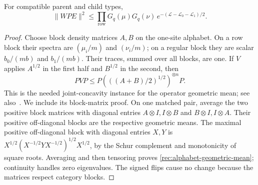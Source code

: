 \begin{lemma}\label{rec:alphabet-angle}
For compatible parent and child types,
\[
 \|WPE\|^2\le
 \prod_{\mathrm{row}}G_q(\mu)G_q(\nu)\,
       e^{-(\mathcal L-\mathcal L_0-\mathcal L_1)/2}.
\]
\end{lemma}
\begin{proof}
Choose block density matrices $A,B$ on the one-site alphabet.  On a
row block their spectra are $(\mu_i/m)$ and $(\nu_i/m)$; on a
regular block they are scalar $b_0/(mb)$ and $b_1/(mb)$.
Their traces, summed over all blocks, are one.  If $V$ applies
$A^{1/2}$ in the first half and $B^{1/2}$ in the second, then
\begin{equation}\label{rec:alphabet-geometric-mean}
 PVP\le P\left(((A+B)/2)^{1/2}\right)^{\otimes n}P.
\end{equation}
This is the needed joint-concavity instance for the operator geometric
mean; see also~\cite[Appendix A.2.1, Lemma~4]{FawziSaunderson2020}.
We include its block-matrix proof.  On one matched pair, average
the two positive block matrices with diagonal entries $A\otimes I,I\otimes B$ and
$B\otimes I,I\otimes A$.  Their positive off-diagonal blocks are
the respective geometric means.  The maximal positive off-diagonal
block with diagonal entries $X,Y$ is
$X^{1/2}(X^{-1/2}YX^{-1/2})^{1/2}X^{1/2}$, by the Schur complement
and monotonicity of square roots.  Averaging and then tensoring proves
\eqref{rec:alphabet-geometric-mean}; continuity handles zero eigenvalues.
The signed flips cause no change because the matrices respect category
blocks.


\end{proof}
